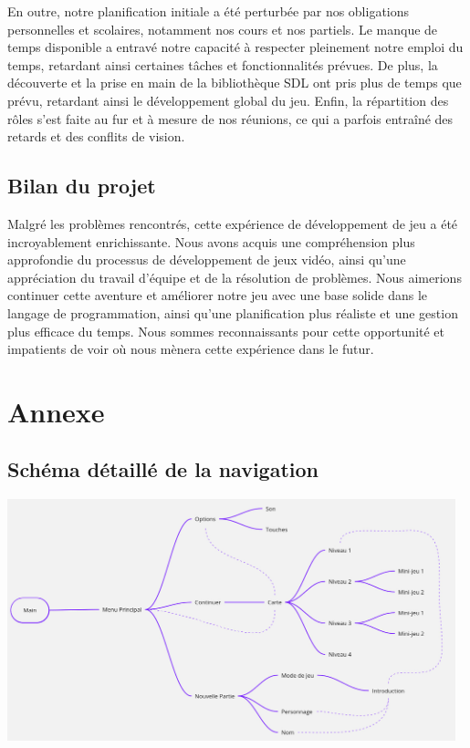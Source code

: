 \documentclass[12pt,a4paper]{article}
\begin{document}
            En outre, notre planification initiale a été perturbée par nos obligations personnelles et scolaires, notamment nos cours et nos partiels. Le manque de temps disponible a entravé notre capacité à respecter pleinement notre emploi du temps, retardant ainsi certaines tâches et fonctionnalités prévues. De plus, la découverte et la prise en main de la bibliothèque SDL ont pris plus de temps que prévu, retardant ainsi le développement global du jeu. Enfin, la répartition des rôles s'est faite au fur et à mesure de nos réunions, ce qui a parfois entraîné des retards et des conflits de vision.\\

        \subsection{Bilan du projet}
            \tabto{1cm} Malgré les problèmes rencontrés, cette expérience de développement de jeu a été incroyablement enrichissante. Nous avons acquis une compréhension plus approfondie du processus de développement de jeux vidéo, ainsi qu'une appréciation du travail d'équipe et de la résolution de problèmes. Nous aimerions continuer cette aventure et améliorer notre jeu avec une base solide dans le langage de programmation, ainsi qu'une planification plus réaliste et une gestion plus efficace du temps. Nous sommes reconnaissants pour cette opportunité et impatients de voir où nous mènera cette expérience dans le futur.

    \section{Annexe}

        \subsection{Schéma détaillé de la navigation}
            \label{subsec:schéma_navigation_detaille}
            \includegraphics[width=13cm]{images/schéma_navigation_détaillé.png}
\end{document}
